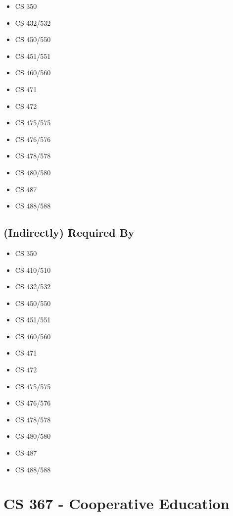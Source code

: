 \documentclass[]{article}
\providecommand{\tightlist}{%
  \setlength{\itemsep}{0pt}\setlength{\parskip}{0pt}}
\begin{document}
\begin{multicols}{2}
\begin{itemize}
\tightlist
\item
  CS 350
\item
  CS 432/532
\item
  CS 450/550
\item
  CS 451/551
\item
  CS 460/560
\item
  CS 471
\item
  CS 472
\item
  CS 475/575
\item
  CS 476/576
\item
  CS 478/578
\item
  CS 480/580
\item
  CS 487
\item
  CS 488/588
\end{itemize}
\end{multicols}

\subsection{(Indirectly) Required By}\label{indirectly-required-by-10}

\begin{multicols}{2}
\begin{itemize}
\tightlist
\item
  CS 350
\item
  CS 410/510
\item
  CS 432/532
\item
  CS 450/550
\item
  CS 451/551
\item
  CS 460/560
\item
  CS 471
\item
  CS 472
\item
  CS 475/575
\item
  CS 476/576
\item
  CS 478/578
\item
  CS 480/580
\item
  CS 487
\item
  CS 488/588
\end{itemize}
\end{multicols}

\newpage
\section{CS 367 - Cooperative
Education}\label{cs-367---cooperative-education}
\end{document}

